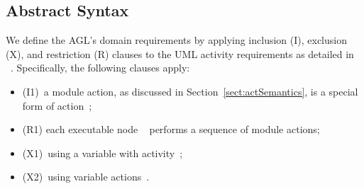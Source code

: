 %
\subsection{Abstract Syntax} 
\label{subsect:agl-abstractSyntax}

We define the AGL's domain requirements by applying inclusion (I), exclusion (X), and restriction (R) clauses to the UML activity requirements as detailed in ~\cite[p.~373]{omg_unified_2017}. Specifically, the following clauses apply: 
\begin{itemize}
	\item (I1)~a module action, as discussed in Section~\ref{sect:actSemantics}, is a special form of action~\cite[p.~441]{omg_unified_2017};
	\item (R1) each executable node ~\cite[p.~403]{omg_unified_2017} performs a sequence of module actions;
	\item (X1)~using a variable with activity~\cite[p.~377]{omg_unified_2017}; 
	\item (X2)~using variable actions~\cite[p.~469]{omg_unified_2017}.
\end{itemize}

